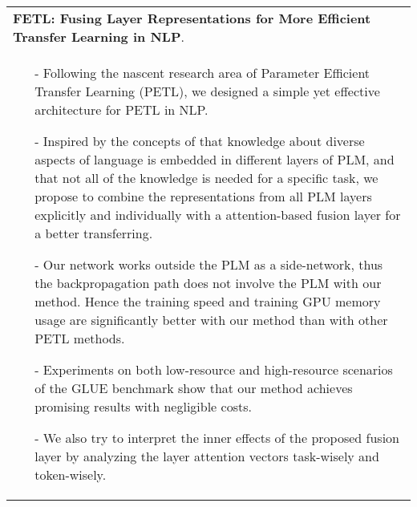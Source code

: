 \documentclass[a4paper,12pt]{article}
\newcommand{\signed}[1]{%
\unskip\nobreak\hfil\penalty50
   \hskip2em\hbox{}\nobreak\hfil#1
   \parfillskip=0pt \finalhyphendemerits=0 }
\begin{document}
\begin{tabularx}{\linewidth}{ @{}X@{} }
\textbf{FETL: Fusing Layer Representations for More Efficient Transfer Learning in NLP}. \signed{\textit{zhuwenq}. under review.}\\[3.75pt]
\begin{minipage}[t]{\linewidth}
    \begin{itemize}[nosep,after=\strut, leftmargin=1em, itemsep=3pt]
        \item[-] Following the nascent research area of Parameter Efficient Transfer Learning (PETL),
        we designed a simple yet effective architecture for PETL in NLP.
        \item[-] Inspired by the concepts of that knowledge about diverse aspects of language is embedded
        in different layers of PLM, and that not all of the knowledge is needed for a specific task,
        we propose to combine the representations from all PLM layers explicitly and individually
        with a attention-based fusion layer for a better transferring.
        \item[-] Our network works outside the PLM as a side-network, thus the backpropagation
        path does not involve the PLM with our method. Hence the training speed and training GPU
        memory usage are significantly better with our method than with other PETL methods.
        \item[-] Experiments on both low-resource and high-resource scenarios of the GLUE benchmark
        show that our method achieves promising results with negligible costs.
        \item[-] We also try to interpret the inner effects of the proposed fusion layer by analyzing
        the layer attention vectors task-wisely and token-wisely.
    \end{itemize}
    \end{minipage}
\end{tabularx}

\end{document}
